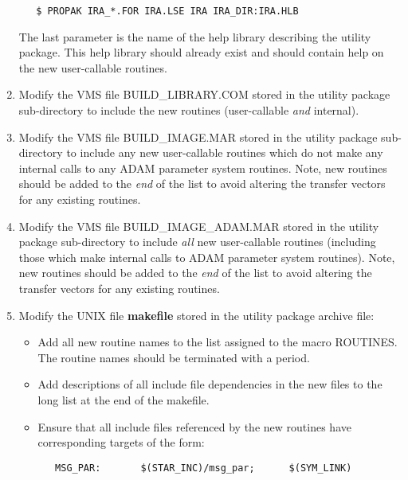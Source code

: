 \begin{enumerate}
\small
\begin{verbatim}
   $ PROPAK IRA_*.FOR IRA.LSE IRA IRA_DIR:IRA.HLB
\end{verbatim}
\normalsize

The last parameter is the name of the help library describing the utility
package. This help library should already exist and should contain help on the
new user-callable routines. 

\item Modify the {\small VMS} file {\small BUILD\_LIBRARY.COM} stored in the 
utility package sub-directory to include the new routines (user-callable {\em 
and} internal).

\item Modify the {\small VMS} file {\small BUILD\_IMAGE.MAR} stored in the
utility package sub-directory to include any new user-callable routines which do
not make any internal calls to any {\small ADAM} parameter system routines.
Note, new routines should be added to the {\em end} of the list to avoid
altering the transfer vectors for any existing routines. 

\item Modify the {\small VMS} file {\small BUILD\_IMAGE\_ADAM.MAR} stored in the
utility package sub-directory to include {\em all} new user-callable routines
(including those which make internal calls to {\small ADAM} parameter system
routines). Note, new routines should be added to the {\em end} of the list to
avoid altering the transfer vectors for any existing routines. 

\item Modify the {\small UNIX} file {\bf makefile} stored in the
utility package archive file:

\begin{itemize}
\item Add all new routine names to the list assigned to the macro {\small ROUTINES}. 
The routine names should be terminated with a period.

\item Add descriptions of all include file dependencies in the new files to the 
long list at the end of the makefile.

\item Ensure that all include files referenced by the new routines have 
corresponding targets of the form:

\small
\begin{verbatim}
   MSG_PAR:       $(STAR_INC)/msg_par;      $(SYM_LINK)
\end{verbatim}
\normalsize


\end{itemize}
\end{enumerate}
